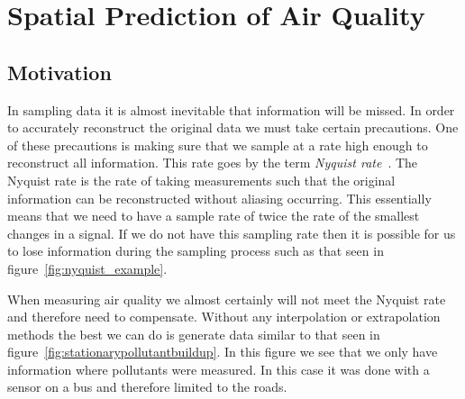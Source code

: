 \chapter{Spatial Prediction of Air Quality}\label{prediction_evaluation}

	\section{Motivation}\label{prediction_evaluation_motivation}

		In sampling data it is almost inevitable that information will be missed. In order to accurately reconstruct the original data we must take certain precautions. One of these precautions is making sure that we sample at a rate high enough to reconstruct all information. This rate goes by the term \emph{Nyquist rate}~\cite{nyquistrate}. The Nyquist rate is the rate of taking measurements such that the original information can be reconstructed without aliasing occurring. This essentially means that we need to have a sample rate of twice the rate of the smallest changes in a signal. If we do not have this sampling rate then it is possible for us to lose information during the sampling process such as that seen in figure~\ref{fig:nyquist_example}.


		When measuring air quality we almost certainly will not meet the Nyquist rate and therefore need to compensate. Without any interpolation or extrapolation methods the best we can do is generate data similar to that seen in figure~\ref{fig:stationarypollutantbuildup}. In this figure we see that we only have information where pollutants were measured. In this case it was done with a sensor on a bus and therefore limited to the roads. 



